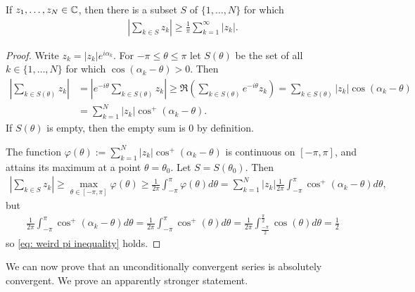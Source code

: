 \documentclass[../../main.tex]{subfiles}
\begin{document}
\begin{lemma} \label{lem: weird pi inequality}
If $z_{1}, \dots, z_{N} \in \mathbb{C}$, then there is a subset $S$ of $\{1, \dots, N\}$ for which
\begin{align}
	\left| \sum_{k\in S} z_{k} \right| \ge \frac{1}{\pi} \sum_{k=1}^{\infty} |z_{k}|. \label{eq: weird pi inequality}
\end{align}
\end{lemma}
\begin{proof}
Write $z_{k}=|z_{k}|e^{i\alpha_{k}}$. For $-\pi \le \theta \le \pi$ let $S(\theta)$ be the set of all $k\in \{1, \dots, N\}$ for which $\cos(\alpha_{k} - \theta) > 0$. Then
\begin{align*}
	\left| \sum_{k\in S(\theta)} z_{k} \right| &= \left| e^{-i\theta} \sum_{k\in S(\theta)} z_{k} \right| \ge \mathfrak{R} \left( \sum_{k\in S(\theta)} e^{-i\theta} z_{k} \right) = \sum_{k\in S(\theta)} |z_{k}|\cos(\alpha_{k} - \theta) \\
	&= \sum_{k=1}^{N} |z_{k}| \cos^{+}(\alpha_{k}- \theta).
\end{align*}
If $S(\theta)$ is empty, then the empty sum is 0 by definition.

The function $\varphi(\theta):=\sum_{k=1}^{N} |z_{k}| \cos^{+}(\alpha_{k}- \theta)$ is continuous on $[-\pi, \pi]$, and attains its maximum at a point $\theta=\theta_{0}$. Let $S=S(\theta_{0})$. Then
\begin{align*}
	\left| \sum_{k\in S} z_{k} \right| \ge \max_{\theta\in [-\pi, \pi]} \varphi(\theta) \ge \frac{1}{2\pi} \int_{-\pi}^{\pi} \varphi(\theta)d\theta = \sum_{k=1}^{N} |z_{k}| \frac{1}{2\pi} \int_{-\pi}^{\pi} \cos^{+}(\alpha_{k}-\theta)d\theta,
\end{align*}
but
\begin{align*}
	\frac{1}{2\pi}\int_{-\pi}^{\pi} \cos^{+}(\alpha_{k}-\theta)d\theta = \frac{1}{2\pi}\int_{-\pi}^{\pi} \cos^{+}(\theta)d\theta=\frac{1}{2\pi}\int_{\frac{-\pi}{2}}^{\frac{\pi}{2}} \cos(\theta)d\theta = \frac{1}{2}
\end{align*}
so \eqref{eq: weird pi inequality} holds.
\end{proof}

We can now prove that an unconditionally convergent series is absolutely convergent. We prove an apparently stronger statement.
\end{document}

